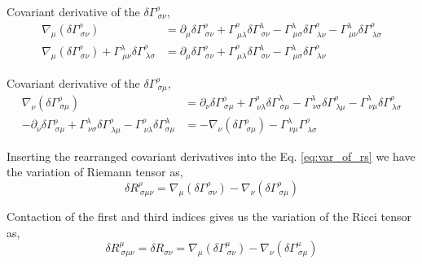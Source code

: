 Covariant derivative of the $\delta\Gamma^{\rho}_{\ \sigma\nu}$,
\begin{equation}
\begin{split}
\nabla_{\mu}\left(\delta\Gamma^{\rho}_{\ \sigma\nu}\right) &= \partial_{\mu}\delta\Gamma^{\rho}_{\ \sigma\nu} + \Gamma^{\rho}_{\ \mu\lambda}\delta\Gamma^{\lambda}_{\ \sigma\nu} - \Gamma^{\lambda}_{\ \mu\sigma}\delta\Gamma^{\rho}_{\ \lambda\nu} - \Gamma^{\lambda}_{\ \mu\nu}\delta \Gamma^{\rho}_{\ \lambda\sigma}\\
\nabla_{\mu}\left(\delta\Gamma^{\rho}_{\ \sigma\nu}\right) + \Gamma^{\lambda}_{\ \mu\nu}\delta\Gamma^{\rho}_{\ \lambda\sigma} &= \partial_{\mu}\delta\Gamma^{\rho}_{\ \sigma\nu} + \Gamma^{\rho}_{\ \mu\lambda}\delta\Gamma^{\lambda}_{\ \sigma\nu} - \Gamma^{\lambda}_{\ \mu\sigma}\delta\Gamma^{\rho}_{\ \lambda\nu}
\end{split}
\end{equation}

Covariant derivative of the $\delta\Gamma^{\rho}_{\ \sigma\mu}$,
\begin{equation}
\begin{split}
\nabla_{\nu}\left(\delta\Gamma^{\rho}_{\ \sigma\mu}\right) &= \partial_{\nu}\delta\Gamma^{\rho}_{\ \sigma\mu} + \Gamma^{\rho}_{\ \nu\lambda}\delta\Gamma^{\lambda}_{\ \sigma\mu} - \Gamma^{\lambda}_{\ \nu\sigma}\delta\Gamma^{\rho}_{\ \lambda\mu} - \Gamma^{\lambda}_{\ \nu\mu}\delta \Gamma^{\rho}_{\ \lambda\sigma}\\
-\partial_{\nu}\delta\Gamma^{\rho}_{\ \sigma\mu} + \Gamma^{\lambda}_{\ \nu\sigma}\delta\Gamma^{\rho}_{\ \lambda\mu} - \Gamma^{\rho}_{\ \nu\lambda}\delta\Gamma^{\lambda}_{\sigma\mu} &= -\nabla_{\nu}\left(\delta\Gamma^{\rho}_{\ \sigma\mu}\right) - \Gamma^{\lambda}_{\ \nu\mu}\Gamma^{\rho}_{\ \lambda\sigma}
\end{split}
\end{equation}

Inserting the rearranged covariant derivatives into the Eq. \ref{eq:var_of_rs} we have the variation of Riemann tensor as,
\begin{equation}
\label{eq:var_of_riemann}
\delta R^{\rho}_{\ \sigma\mu\nu} = \nabla_{\mu}\left(\delta\Gamma^{\rho}_{\ \sigma\nu}\right) - \nabla_{\nu}\left(\delta\Gamma^{\rho}_{\ \sigma\mu}\right)
\end{equation}

Contaction of the first and third indices gives us the variation of the Ricci tensor as,
\begin{equation}
\label{eq:var_of_ricci_t}
\delta R^{\mu}_{\ \sigma\mu\nu} = \delta R_{\sigma\nu} = \nabla_{\mu}\left(\delta\Gamma^{\mu}_{\ \sigma\nu}\right) - \nabla_{\nu}\left(\delta\Gamma^{\mu}_{\ \sigma\mu}\right)
\end{equation}


